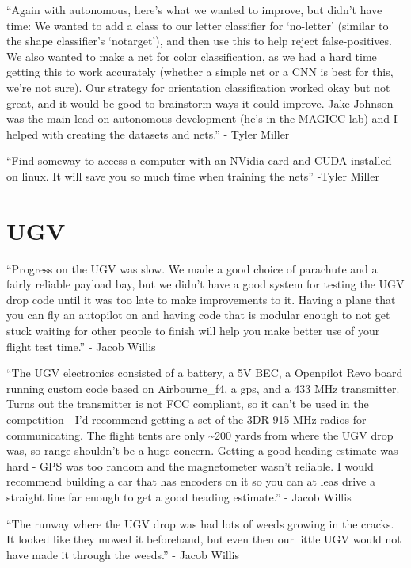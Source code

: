 \documentclass[]{auvsi_doc}
\begin{document}
{}

{``Again with autonomous, here's what we wanted to improve, but didn't
have time: We wanted to add a class to our letter classifier for
`no-letter' (similar to the shape classifier's `notarget'), and then use
this to help reject false-positives. We also wanted to make a net for
color classification, as we had a hard time getting this to work
accurately (whether a simple net or a CNN is best for this, we're not
sure). Our strategy for orientation classification worked okay but not
great, and it would be good to brainstorm ways it could improve. Jake
Johnson was the main lead on autonomous development (he's in the MAGICC
lab) and I helped with creating the datasets and nets.'' - Tyler Miller}

{}

{``Find someway to access a computer with an NVidia card and CUDA
installed on linux. It will save you so much time when training the
nets'' -Tyler Miller}

\section{UGV}

{``Progress on the UGV was slow. We made a good choice of parachute and
a fairly reliable payload bay, but we didn't have a good system for
testing the UGV drop code until it was too late to make improvements to
it. Having a plane that you can fly an autopilot on and having code that
is modular enough to not get stuck waiting for other people to finish
will help you make better use of your flight test time.'' - Jacob
Willis}

{}

{``The UGV electronics consisted of a battery, a 5V BEC, a Openpilot
Revo board running custom code based on Airbourne\_f4, a gps, and a 433
MHz transmitter. Turns out the transmitter is not FCC compliant, so it
can't be used in the competition - I'd recommend getting a set of the
3DR 915 MHz radios for communicating. The flight tents are only
\textasciitilde{}200 yards from where the UGV drop was, so range
shouldn't be a huge concern. Getting a good heading estimate was hard -
GPS was too random and the magnetometer wasn't reliable. I would
recommend building a car that has encoders on it so you can at leas
drive a straight line far enough to get a good heading estimate.'' -
Jacob Willis}

{}

{``The runway where the UGV drop was had lots of weeds growing in the
cracks. It looked like they mowed it beforehand, but even then our
little UGV would not have made it through the weeds.'' - Jacob Willis}
\end{document}
